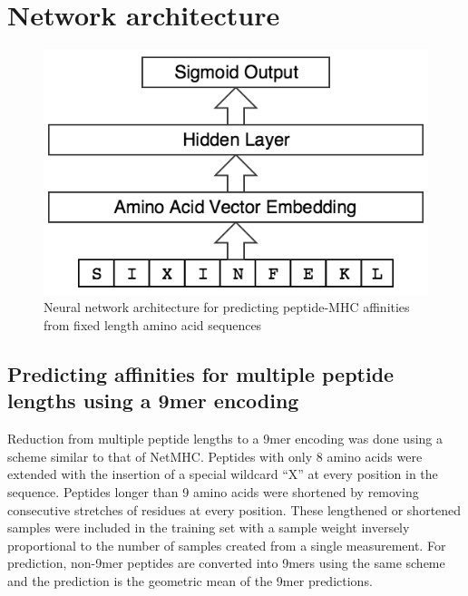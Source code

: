 
\section{Network architecture}

\begin{figure}[h]
\centering
\includegraphics[scale=0.5]{figures/mhcflurry-gliffy-network.png}
\caption{Neural network architecture for predicting peptide-MHC affinities from fixed length amino acid sequences}
\end{figure}

\subsection{Predicting affinities for multiple peptide lengths using a 9mer encoding}
Reduction from multiple peptide lengths to a 9mer encoding was done using a scheme similar to that of NetMHC\cite{lundegaard2008accurate}. Peptides with only 8 amino acids were extended with the insertion of a special wildcard ``X'' at every position in the sequence. Peptides longer than 9 amino acids were shortened by removing consecutive stretches of residues at every position. These lengthened or shortened samples were included in the training set with a sample weight inversely proportional to the number of samples created from a single measurement. For prediction, non-9mer peptides are converted into 9mers using the same scheme and the prediction is the geometric mean of the 9mer predictions.